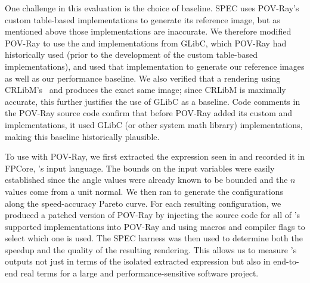 \documentclass[paper.tex]{subfiles}
\begin{document}
One challenge in this evaluation is the choice of baseline.
SPEC uses POV-Ray's custom table-based implementations
  to generate its reference image,
  but as mentioned above those implementations are inaccurate.
We therefore modified POV-Ray
  to use the  and  implementations from GLibC,
  which POV-Ray had historically used
  (prior to the development of the custom table-based implementations),
  and used that implementation
  to generate our reference images as well as our performance baseline.
We also verified
  that a rendering using CRLibM's~\cite{crlibm}  and 
  produces the exact same image;
  since CRLibM is maximally accurate,
  this further justifies the use of GLibC as a baseline.
Code comments in the POV-Ray source code
  confirm that before POV-Ray added
  its custom  and  implementations,
  it used GLibC (or other system math library) implementations,
  making this baseline historically plausible.

To use \name with POV-Ray,
   we first extracted the expression seen in 
   and recorded it in FPCore, \name's input language.
The bounds on the input variables were easily established
  since the angle values were already known to be bounded
  and the $n$ values come from a unit normal.
We then ran \name to generate the configurations
  along the speed-accuracy Pareto curve.
For each resulting configuration,
  we produced a patched version of POV-Ray
  by injecting the source code
  for all of \name's supported implementations into POV-Ray
  and using macros and compiler flags to select which one is used.
The SPEC harness was then used
  to determine both the speedup and the quality of the resulting rendering.
This allows us to measure \name's outputs
  not just in terms of the isolated extracted expression
  but also in end-to-end real terms
  for a large and performance-sensitive software project.
\end{document}
